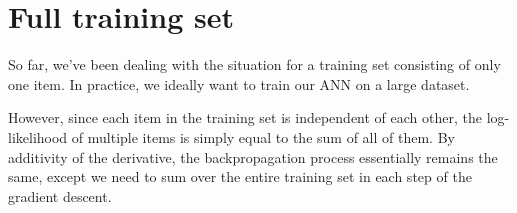\documentclass[12pt, a4paper]{article}
\numberwithin{equation}{section}
\begin{document}
\section{Full training set}
So far, we've been dealing with the situation for a training set consisting of only one item. In practice, we ideally want to train our ANN on a large dataset.

However, since each item in the training set is independent of each other, the log-likelihood of multiple items is simply equal to the sum of all of them. By additivity of the derivative, the backpropagation process essentially remains the same, except we need to sum over the entire training set in each step of the gradient descent.
\end{document}

